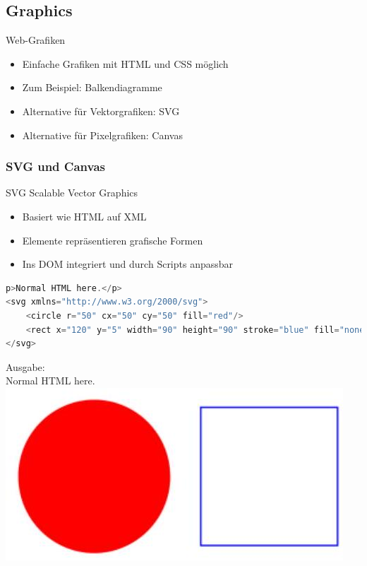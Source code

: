 \subsection{Graphics}

\begin{definition}{Web-Grafiken}
\begin{itemize}
  \item Einfache Grafiken mit HTML und CSS möglich
  \item Zum Beispiel: Balkendiagramme
  \item Alternative für Vektorgrafiken: SVG
  \item Alternative für Pixelgrafiken: Canvas
\end{itemize}
\end{definition}

\subsubsection{SVG und Canvas}

\begin{definition}{SVG}
Scalable Vector Graphics
\begin{itemize}
  \item Basiert wie HTML auf XML
  \item Elemente repräsentieren grafische Formen
  \item Ins DOM integriert und durch Scripts anpassbar
\end{itemize}
\begin{lstlisting}[language=JavaScript, style=basesmol]
p>Normal HTML here.</p>
<svg xmlns="http://www.w3.org/2000/svg">
    <circle r="50" cx="50" cy="50" fill="red"/>
    <rect x="120" y="5" width="90" height="90" stroke="blue" fill="none"/>
</svg>
\end{lstlisting}
Ausgabe:\\
Normal HTML here.\\
\includegraphics[width=\linewidth]{images/2024_12_29_858f09cde51177c71657g-27}
\end{definition}

